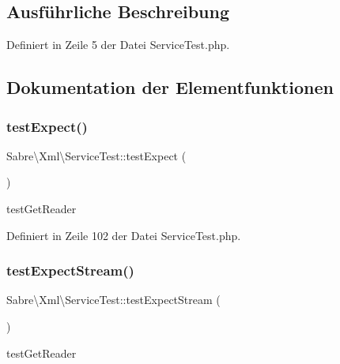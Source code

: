 \subsection{Ausführliche Beschreibung}


Definiert in Zeile 5 der Datei Service\+Test.\+php.



\subsection{Dokumentation der Elementfunktionen}
\mbox{\label{class_sabre_1_1_xml_1_1_service_test_a2a9439b7962f8e4bdd266bbd22efc415}} 
\subsubsection{\texorpdfstring{test\+Expect()}{testExpect()}}
{\footnotesize\ttfamily Sabre\textbackslash{}\+Xml\textbackslash{}\+Service\+Test\+::test\+Expect (\begin{DoxyParamCaption}{ }\end{DoxyParamCaption})}

test\+Get\+Reader 

Definiert in Zeile 102 der Datei Service\+Test.\+php.

\mbox{\label{class_sabre_1_1_xml_1_1_service_test_ad88a945b5948ffdeb32897709471c284}} 
\subsubsection{\texorpdfstring{test\+Expect\+Stream()}{testExpectStream()}}
{\footnotesize\ttfamily Sabre\textbackslash{}\+Xml\textbackslash{}\+Service\+Test\+::test\+Expect\+Stream (\begin{DoxyParamCaption}{ }\end{DoxyParamCaption})}

test\+Get\+Reader 


